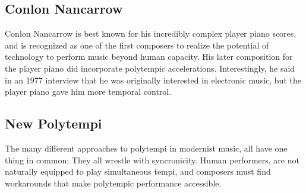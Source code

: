 
\subsection{Conlon Nancarrow}
\label{sec:conlon-nancarrow}
Conlon Nancarrow is best known for his incredibly complex player piano
scores, and is recognized as one of the first composers to realize the
potential of technology to perform music beyond human capacity. His
later composition for the player piano did incorporate polytempic
accelerations.\cite{Rao2005} Interestingly, he said in an 1977
interview that he was originally interested in electronic music, but
the player piano gave him more temporal control.\cite{Amirkhanian1977}


\subsection{New Polytempi}
\label{sec:new-polytempi}
The many different approaches to polytempi in modernist music, all
have one thing in common: They all wrestle with syncronicity. Human
performers, are not naturally equipped to play simultaneous tempi, and
composers must find workarounds that make polytempic performance
accessible.

